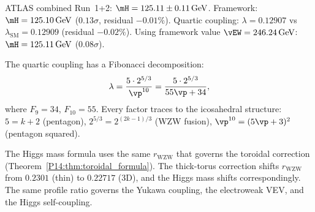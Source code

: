 \begin{remark}
\label{P14:rem:higgs_numerics}
ATLAS combined Run~1+2: $\mH=125.11\pm0.11\,\mathrm{GeV}$.
Framework: $\mH=125.10\,\mathrm{GeV}$ ($0.13\sigma$, residual $-0.01\%$).
Quartic coupling: $\lambda=0.12907$ vs $\lambda_{\mathrm{SM}}=0.12909$ (residual $-0.02\%$).
Using framework value $\vEW=246.24\,\mathrm{GeV}$: $\mH=125.11\,\mathrm{GeV}$ ($0.08\sigma$).
\end{remark}

\begin{remark}
\label{P14:rem:higgs_algebra}
The quartic coupling has a Fibonacci decomposition:
\begin{equation}
  \lambda = \frac{5\cdot2^{5/3}}{\vp^{10}} = \frac{5\cdot2^{5/3}}{55\vp+34},
\end{equation}
where $F_9=34$, $F_{10}=55$.
Every factor traces to the icosahedral structure: $5=k+2$ (pentagon),
$2^{5/3}=2^{(2k-1)/3}$ (WZW fusion), $\vp^{10}=(5\vp+3)^2$ (pentagon squared).
\end{remark}

\begin{remark}
\label{P14:rem:higgs_consistency}
The Higgs mass formula uses the same $r_{\mathrm{WZW}}$ that governs the toroidal
correction (Theorem~\ref{P14:thm:toroidal_formula}).
The thick-torus correction shifts $r_{\mathrm{WZW}}$ from $0.2301$ (thin) to $0.22717$ (3D),
and the Higgs mass shifts correspondingly.
The same profile ratio governs the Yukawa coupling, the electroweak VEV, and the Higgs self-coupling.
\end{remark}

